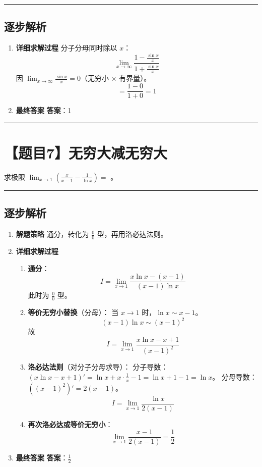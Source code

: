 \documentclass[UTF8]{ctexart}
\newenvironment{redenv}{\color{red}}{}
\newenvironment{detailedanalysis}{%
    \color{red}
    \begin{enumerate}[label=\textbf{第\arabic*步：}, leftmargin=*, align=left, itemsep=1.5ex]
}{%
    \end{enumerate}
}
\newcommand{\problemrule}{\noindent\rule{\textwidth}{1.5pt}\vspace{-0.8em}}
\newcommand{\analysisrule}{\noindent\rule{\textwidth}{0.8pt}\vspace{-0.8em}}
\newcommand{\blank}[1]{\underline{\hspace{#1}}}
\begin{document}
\begin{redenv}
\analysisrule
\subsection*{逐步解析}

\begin{detailedanalysis}
\item \textbf{详细求解过程}
分子分母同时除以 $x$：
$$ \lim_{x \to \infty} \frac{1 - \frac{\sin x}{x}}{1 + \frac{\sin x}{x}} $$
因 $\lim_{x \to \infty} \frac{\sin x}{x} = 0$（无穷小 $\times$ 有界量）。
$$ = \frac{1 - 0}{1 + 0} = 1 $$

\item \textbf{最终答案}
\textbf{答案}：1
\end{detailedanalysis}
\end{redenv}

\problemrule
\section*{【题目7】无穷大减无穷大}
求极限 $ \lim_{x\to1}\left(\frac{x}{x-1}-\frac{1}{\ln x}\right)= $ \blank{2cm}。

\begin{redenv}
\analysisrule
\subsection*{逐步解析}

\begin{detailedanalysis}
\item \textbf{解题策略}
通分，转化为 $\frac{0}{0}$ 型，再用洛必达法则。

\item \textbf{详细求解过程}
\begin{enumerate}[label=(\arabic*)]
\item \textbf{通分}：
$$ I = \lim_{x \to 1} \frac{x \ln x - (x - 1)}{(x - 1) \ln x} $$
此时为 $\frac{0}{0}$ 型。

\item \textbf{等价无穷小替换}（分母）：
当 $x \to 1$ 时，$\ln x \sim x - 1$。
$$ (x - 1) \ln x \sim (x - 1)^2 $$
故 $$ I = \lim_{x \to 1} \frac{x \ln x - x + 1}{(x - 1)^2} $$

\item \textbf{洛必达法则}（对分子分母求导）：
分子导数：$(x \ln x - x + 1)' = \ln x + x \cdot \frac{1}{x} - 1 = \ln x + 1 - 1 = \ln x$。
分母导数：$((x - 1)^2)' = 2(x - 1)$。
$$ I = \lim_{x \to 1} \frac{\ln x}{2(x - 1)} $$

\item \textbf{再次洛必达或等价无穷小}：
$$ \lim_{x \to 1} \frac{x - 1}{2(x - 1)} = \frac{1}{2} $$
\end{enumerate}

\item \textbf{最终答案}
\textbf{答案}：$ \frac{1}{2} $
\end{detailedanalysis}
\end{redenv}
\end{document}
